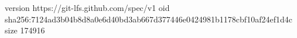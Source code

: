 version https://git-lfs.github.com/spec/v1
oid sha256:7124ad3b04b8d8a0e6d40bd3ab667d377446e0424981b1178cbf10af24ef1d4c
size 174916
